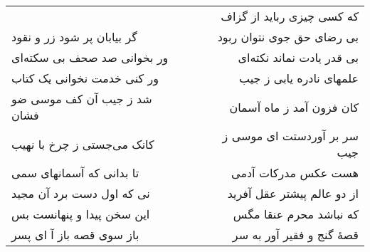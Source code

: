 \begin{center}
\begin{longtable}{l p{0.5cm} r}
&&
که کسی چیزی رباید از گزاف
\\
گر بیابان پر شود زر و نقود
&&
بی رضای حق جوی نتوان ربود
\\
ور بخوانی صد صحف بی سکته‌ای
&&
بی قدر یادت نماند نکته‌ای
\\
ور کنی خدمت نخوانی یک کتاب
&&
علمهای نادره یابی ز جیب
\\
شد ز جیب آن کف موسی ضو فشان
&&
کان فزون آمد ز ماه آسمان
\\
کانک می‌جستی ز چرخ با نهیب
&&
سر بر آوردستت ای موسی ز جیب
\\
تا بدانی که آسمانهای سمی
&&
هست عکس مدرکات آدمی
\\
نی که اول دست برد آن مجید
&&
از دو عالم پیشتر عقل آفرید
\\
این سخن پیدا و پنهانست بس
&&
که نباشد محرم عنقا مگس
\\
باز سوی قصه باز آ ای پسر
&&
قصهٔ گنج و فقیر آور به سر
\\
\end{longtable}
\end{center}
